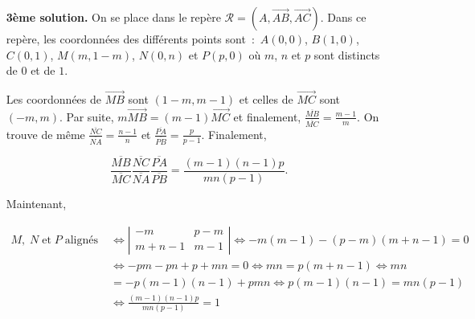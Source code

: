 {{\begin{itemize}
Maintenant, le produit $k_1k_2$ peut-il être égal à $1$~?~Si c'était le cas, on aurait $\frac{\overline{MB}}{\overline{MC}}\frac{\overline{NC}}{\overline{NA}}=1$ et donc, $\frac{\overline{MB}}{\overline{MC}}=\frac{\overline{NA}}{\overline{NC}}$. La réciproque du théorème de \textsc{Thales} permettrait alors d'affirmer que $(MN)$ et $(AB)$ sont parallèles, ce qui n'est pas. Donc, $k_1k_2\neq1$ et d'après l'exercice \ref{exo:suprou7bis}, $h_1\circ h_2$ est une homothétie. Puisque $h_1\circ h_2$ transforme $A$ en $B$, son centre est sur la droite $(AB)$. Mais d'autre part, son centre est sur la droite des centres $(MN)$. Finalement, le centre de $h_1\circ h_2$ est le point d'intersection de $(MN)$ et $(AB)$, c'est-à-dire le point $P$.

Mais alors, le rapport de $h_1\circ h_2$ vaut également $\frac{\overline{PB}}{\overline{PA}}$. Ainsi, 
$\frac{\overline{MB}}{\overline{MC}}\frac{\overline{NC}}{\overline{NA}}=\frac{\overline{PB}}{\overline{PA}}$ et finalement, $\frac{\overline{MB}}{\overline{MC}}\frac{\overline{NC}}{\overline{NA}}\frac{\overline{PA}}{\overline{PB}}=1$.

\item[\textbf{3ème solution.}] On se place dans le repère $\mathcal{R}=(A,\overrightarrow{AB},\overrightarrow{AC})$. Dans ce repère, les coordonnées des différents points sont~:~$A(0,0)$, $B(1,0)$, $C(0,1)$, $M(m,1-m)$, $N(0,n)$ et $P(p,0)$ où $m$, $n$ et $p$ sont distincts de $0$ et de $1$.

Les coordonnées de $\overrightarrow{MB}$ sont $(1-m,m-1)$ et celles de $\overrightarrow{MC}$ sont $(-m,m)$. Par suite, $m\overrightarrow{MB}=(m-1)\overrightarrow{MC}$ et finalement, $\frac{\overline{MB}}{\overline{MC}}=\frac{m-1}{m}$. On trouve de même $\frac{\overline{NC}}{\overline{NA}}=\frac{n-1}{n}$ et $\frac{\overline{PA}}{\overline{PB}}=\frac{p}{p-1}$. Finalement,

$$\frac{\overline{MB}}{\overline{MC}}\frac{\overline{NC}}{\overline{NA}}\frac{\overline{PA}}{\overline{PB}}=
\frac{(m-1)(n-1)p}{mn(p-1)}.$$

Maintenant,

\begin{align*}
M,\;N\;\mbox{et}\;P\;\mbox{alignés}\;&\Leftrightarrow
\left|
\begin{array}{cc}
-m&p-m\\
m+n-1&m-1
\end{array}
\right|
\Leftrightarrow-m(m-1)-(p-m)(m+n-1)=0\\
 &\Leftrightarrow-pm-pn+p+mn=0\Leftrightarrow mn=p(m+n-1)\Leftrightarrow mn\\
 &=-p(m-1)(n-1)+pmn\Leftrightarrow p(m-1)(n-1)=mn(p-1)\\
 &\Leftrightarrow\frac{(m-1)(n-1)p}{mn(p-1)}=1
\end{align*}


\end{itemize}}}
